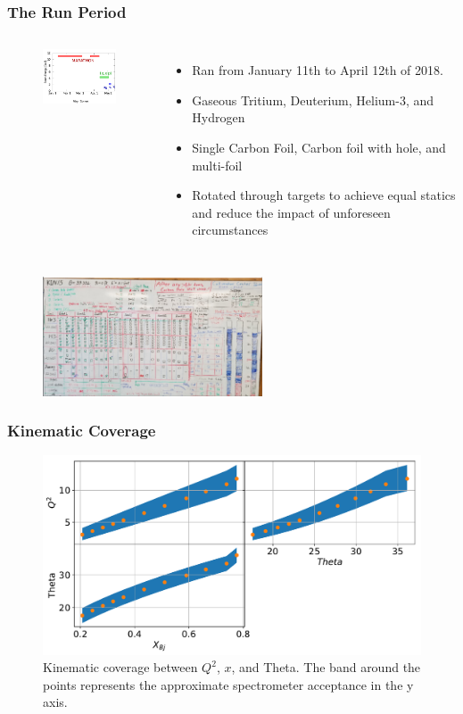 \documentclass[12pt]{beamer}
\begin{document}
\begin{frame}
\frametitle{The Run Period}
\vspace{-20pt}
\begin{columns}
	\begin{figure}
		\includegraphics[width=4.5cm]{../images/run_per}
	\end{figure}
	\vspace{-10pt}
	\begin{itemize}
		\item Ran from January 11th to April 12th of 2018.
		\item Gaseous Tritium, Deuterium, Helium-3, and Hydrogen
		\item Single Carbon Foil, Carbon foil with hole, and multi-foil
		\item Rotated through targets to achieve equal statics and reduce the impact of unforeseen circumstances
	\end{itemize}
\end{columns}
\begin{figure}
	\includegraphics[width=6.5cm]{../images/whiteboard_2_20}
\end{figure}
\end{frame}

\begin{frame}
\frametitle{Kinematic Coverage}

\begin{figure}[h]

	\centering
	\includegraphics[width=12.cm]{../images/Thesis/KinCov.pdf}
	\caption*{Kinematic coverage between $Q^2$, $x$, and Theta. The band around the points represents the approximate spectrometer acceptance in the y axis.}
	\label{fig:kincov}
\end{figure}
\end{frame}
\end{document}
